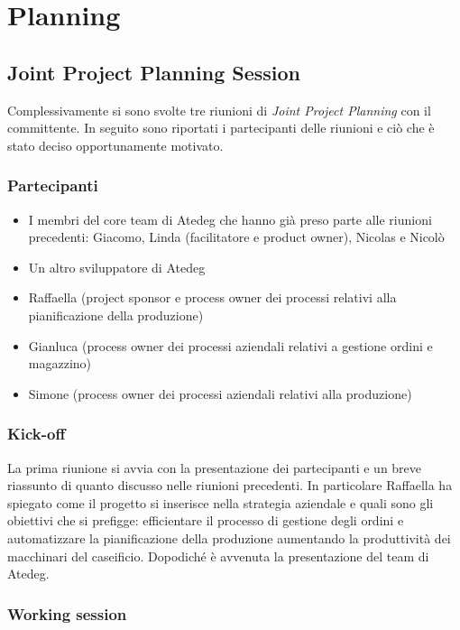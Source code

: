 \chapter{Planning}\label{ch:planning}

\section{Joint Project Planning Session}\label{sec:JPPS}
Complessivamente si sono svolte tre riunioni di \emph{Joint Project Planning} con il committente. In seguito sono riportati i partecipanti delle riunioni e ciò che è stato deciso opportunamente motivato.

\subsection{Partecipanti}
\begin{itemize}
  \item I membri del core team di Atedeg che hanno già preso parte alle riunioni precedenti: Giacomo, Linda (facilitatore e product owner), Nicolas e Nicolò
  \item Un altro sviluppatore di Atedeg
  \item Raffaella (project sponsor e process owner dei processi relativi alla pianificazione della produzione)
  \item Gianluca (process owner dei processi aziendali relativi a gestione ordini e magazzino)
  \item Simone (process owner dei processi aziendali relativi alla produzione)
\end{itemize}

\subsection{Kick-off}
La prima riunione si avvia con la presentazione dei partecipanti e un breve riassunto di quanto discusso nelle riunioni precedenti. In particolare Raffaella ha spiegato come il progetto si inserisce nella strategia aziendale e quali sono gli obiettivi che si prefigge: efficientare il processo di gestione degli ordini e automatizzare la pianificazione della produzione aumentando la produttività dei macchinari del caseificio.
Dopodiché è avvenuta la presentazione del team di Atedeg.

\subsection{Working session}

